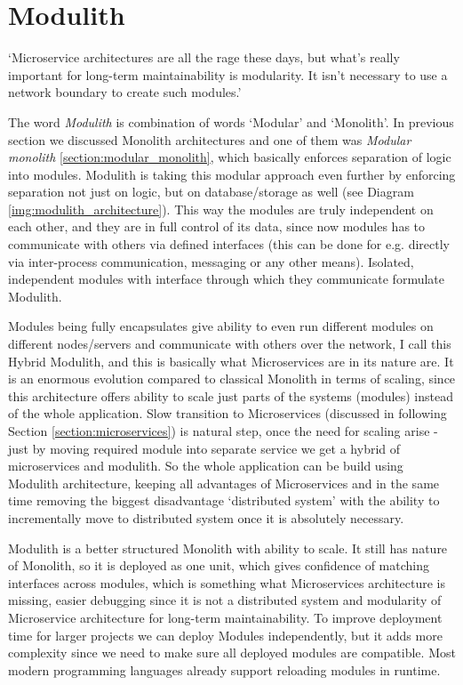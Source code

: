 \section{Modulith}
\label{section:modulith}
`Microservice architectures are all the rage these days, but what's really important for long-term maintainability is modularity. It isn't necessary to use a network boundary to create such modules.' \cite{HOW_TO_BUILD_MODULAR_MONOLITH_CONFERENCE_INTRO}

The word \textit{Modulith} is combination of words `Modular' and `Monolith'. In previous section we discussed Monolith architectures and one of them was \textit{Modular monolith} \ref{section:modular_monolith}, which basically enforces separation of logic into modules. Modulith is taking this modular approach even further by enforcing separation not just on logic, but on database/storage as well (see Diagram \ref{img:modulith_architecture}). This way the modules are truly independent on each other, and they are in full control of its data, since now modules has to communicate with others via defined interfaces (this can be done for e.g. directly via inter-process communication, messaging or any other means). Isolated, independent modules with interface through which they communicate formulate Modulith.

Modules being fully encapsulates give ability to even run different modules on different nodes/servers and communicate with others over the network, I call this Hybrid Modulith, and this is basically what Microservices are in its nature are. It is an enormous evolution compared to classical Monolith in terms of scaling, since this architecture offers ability to scale just parts of the systems (modules) instead of the whole application. Slow transition to Microservices (discussed in following Section \ref{section:microservices}) is natural step, once the need for scaling arise - just by moving required module into separate service we get a hybrid of microservices and modulith. So the whole application can be build using Modulith architecture, keeping all advantages of Microservices and in the same time removing the biggest disadvantage `distributed system' with the ability to incrementally move to distributed system once it is absolutely necessary.

Modulith is a better structured Monolith with ability to scale. It still has nature of Monolith, so it is deployed as one unit, which gives confidence of matching interfaces across modules, which is something what Microservices architecture is missing, easier debugging since it is not a distributed system and modularity of Microservice architecture for long-term maintainability. To improve deployment time for larger projects we can deploy Modules independently, but it adds more complexity since we need to make sure all deployed modules are compatible. Most modern programming languages already support reloading modules in runtime.

